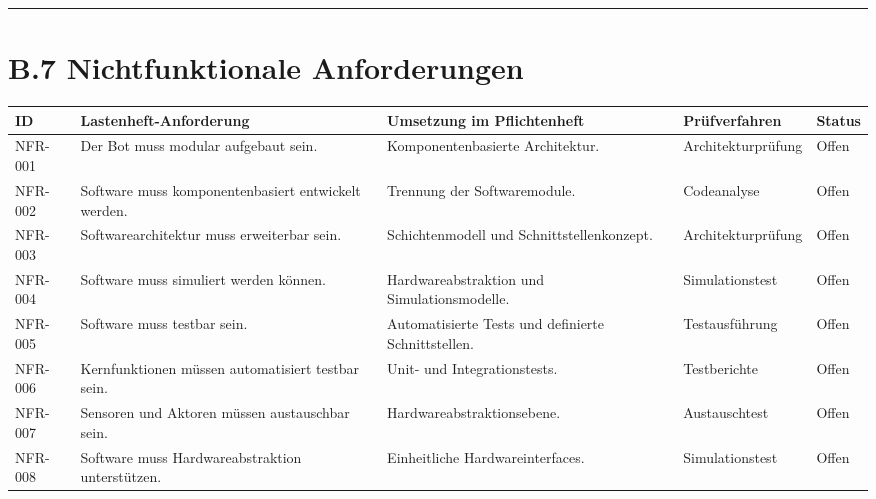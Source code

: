 \documentclass[
  a4paper,
  12pt,
  DIV=12,        %
  parskip=half,  %
  headings=small %
]{scrartcl}
\theoremstyle{definition}
\theoremstyle{definition}
\begin{document}
\begin{center}\rule{0.5\linewidth}{0.5pt}\end{center}

\section{B.7 Nichtfunktionale
Anforderungen}\label{b.7-nichtfunktionale-anforderungen}

\begin{longtable}[]{@{}
  >{\raggedright\arraybackslash}p{}
  >{\raggedright\arraybackslash}p{}
  >{\raggedright\arraybackslash}p{}
  >{\raggedright\arraybackslash}p{}
  >{\raggedright\arraybackslash}p{}@{}}
\toprule\noalign{}
\begin{minipage}[b]{\linewidth}\raggedright
ID
\end{minipage} & \begin{minipage}[b]{\linewidth}\raggedright
Lastenheft-Anforderung
\end{minipage} & \begin{minipage}[b]{\linewidth}\raggedright
Umsetzung im Pflichtenheft
\end{minipage} & \begin{minipage}[b]{\linewidth}\raggedright
Prüfverfahren
\end{minipage} & \begin{minipage}[b]{\linewidth}\raggedright
Status
\end{minipage} \\
\midrule\noalign{}
\endhead
\bottomrule\noalign{}
\endlastfoot
NFR-001 & Der Bot muss modular aufgebaut sein. & Komponentenbasierte
Architektur. & Architekturprüfung & Offen \\
NFR-002 & Software muss komponentenbasiert entwickelt werden. & Trennung
der Softwaremodule. & Codeanalyse & Offen \\
NFR-003 & Softwarearchitektur muss erweiterbar sein. & Schichtenmodell
und Schnittstellenkonzept. & Architekturprüfung & Offen \\
NFR-004 & Software muss simuliert werden können. & Hardwareabstraktion
und Simulationsmodelle. & Simulationstest & Offen \\
NFR-005 & Software muss testbar sein. & Automatisierte Tests und
definierte Schnittstellen. & Testausführung & Offen \\
NFR-006 & Kernfunktionen müssen automatisiert testbar sein. & Unit- und
Integrationstests. & Testberichte & Offen \\
NFR-007 & Sensoren und Aktoren müssen austauschbar sein. &
Hardwareabstraktionsebene. & Austauschtest & Offen \\
NFR-008 & Software muss Hardwareabstraktion unterstützen. & Einheitliche
Hardwareinterfaces. & Simulationstest & Offen \\
\end{longtable}
\end{document}
